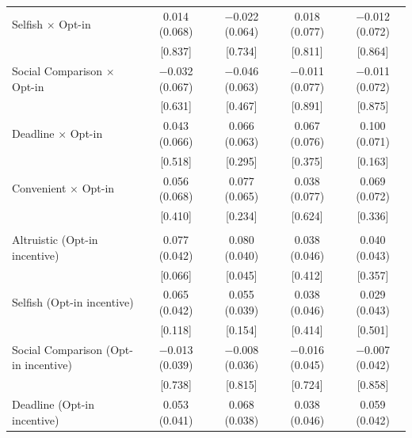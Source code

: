 \documentclass[
    a4paper
]{article}
\begin{document}
\begin{table}
\begin{threeparttable}
\begin{tabular}[t]{lcccc}
Selfish $\times$ Opt-in & \num{0.014} (\num{0.068}) & \num{-0.022} (\num{0.064}) & \num{0.018} (\num{0.077}) & \num{-0.012} (\num{0.072})\\
 & {}[\num{0.837}] & {}[\num{0.734}] & {}[\num{0.811}] & {}[\num{0.864}]\\
Social Comparison $\times$ Opt-in & \num{-0.032} (\num{0.067}) & \num{-0.046} (\num{0.063}) & \num{-0.011} (\num{0.077}) & \num{-0.011} (\num{0.072})\\
 & {}[\num{0.631}] & {}[\num{0.467}] & {}[\num{0.891}] & {}[\num{0.875}]\\
Deadline $\times$ Opt-in & \num{0.043} (\num{0.066}) & \num{0.066} (\num{0.063}) & \num{0.067} (\num{0.076}) & \num{0.100} (\num{0.071})\\
 & {}[\num{0.518}] & {}[\num{0.295}] & {}[\num{0.375}] & {}[\num{0.163}]\\
Convenient $\times$ Opt-in & \num{0.056} (\num{0.068}) & \num{0.077} (\num{0.065}) & \num{0.038} (\num{0.077}) & \num{0.069} (\num{0.072})\\
 & {}[\num{0.410}] & {}[\num{0.234}] & {}[\num{0.624}] & {}[\num{0.336}]\\
\addlinespace[0.3em]
\multicolumn{5}{l}{\textbf{Linear combination test: Treatment + Opt-in $\times$ Treatment}}\\
\hspace{1em}Altruistic (Opt-in incentive) & \num{0.077} (\num{0.042}) & \num{0.080} (\num{0.040}) & \num{0.038} (\num{0.046}) & \num{0.040} (\num{0.043})\\
\hspace{1em} & {}[\num{0.066}] & {}[\num{0.045}] & {}[\num{0.412}] & {}[\num{0.357}]\\
\hspace{1em}Selfish (Opt-in incentive) & \num{0.065} (\num{0.042}) & \num{0.055} (\num{0.039}) & \num{0.038} (\num{0.046}) & \num{0.029} (\num{0.043})\\
\hspace{1em} & {}[\num{0.118}] & {}[\num{0.154}] & {}[\num{0.414}] & {}[\num{0.501}]\\
\hspace{1em}Social Comparison (Opt-in incentive) & \num{-0.013} (\num{0.039}) & \num{-0.008} (\num{0.036}) & \num{-0.016} (\num{0.045}) & \num{-0.007} (\num{0.042})\\
\hspace{1em} & {}[\num{0.738}] & {}[\num{0.815}] & {}[\num{0.724}] & {}[\num{0.858}]\\
\hspace{1em}Deadline (Opt-in incentive) & \num{0.053} (\num{0.041}) & \num{0.068} (\num{0.038}) & \num{0.038} (\num{0.046}) & \num{0.059} (\num{0.042})\\

\end{tabular}
\end{threeparttable}
\end{table}
\end{document}
